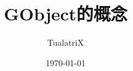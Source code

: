 \documentclass[a4paper]{book}
\begin{document}
\begin{CJK}{UTF8}{song}
\title{GObject的概念}
\author{TualatriX}
\date{\today}

\maketitle
\tableofcontents
\newpage






\newpage
\end{CJK}
\end{document}
